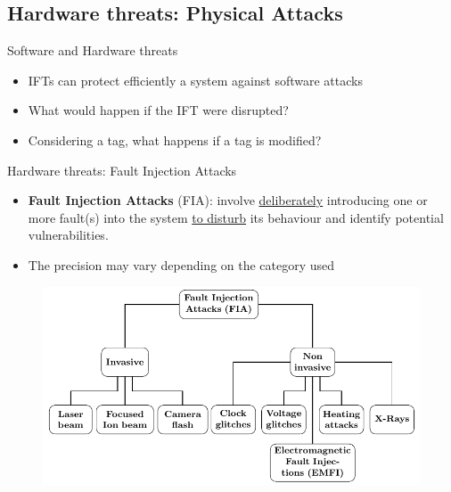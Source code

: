 \subsection{Hardware threats: Physical Attacks}
\begin{frame}{Software and Hardware threats}
    \begin{block}{}
        \begin{itemize}
            [square]
            \justifying
            \item IFTs can protect efficiently a system against software attacks
            \item What would happen if the IFT were disrupted?
            \item Considering a tag, what happens if a tag is modified?
        \end{itemize}
    \end{block}
\end{frame}

\begin{frame}{Hardware threats: Fault Injection Attacks}
    \begin{minipage}[c]{0.5\textwidth}
        \begin{block}{}
            \begin{itemize}
                [square]
                \justifying
                \item \textbf{Fault Injection Attacks} (FIA): involve \underline{deliberately} introducing one or more fault(s) into the system \underline{to disturb} its behaviour and identify potential vulnerabilities.
                \item The precision may vary depending on the category used
            \end{itemize}
        \end{block}
        \end{minipage}\hfill%
    \begin{minipage}[c]{0.5\textwidth}
        \begin{figure}
            \centering
            \includegraphics[height=.75\textheight, page=2]{src/1_introduction/img/physicalAttacks.pdf}
            \label{fig:fia}
        \end{figure}
    \end{minipage}
\end{frame}
